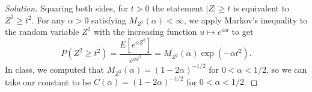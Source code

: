 \documentclass{article}
\begin{document}
\begin{proof}[Solution]
Squaring both sides, for $t > 0$ the statement $\lvert Z\rvert\geq t$ is equivalent to $Z^2\geq t^2$. For any $\alpha > 0$ satisfying $M_{Z^2}(\alpha) < \infty$, we apply Markov's inequality to the random variable $Z^2$ with the increasing function $u\mapsto e^{\alpha u}$ to get
\begin{equation*}
P(Z^2\geq t^2) = \frac{E[e^{\alpha Z^2}]}{e^{\alpha t^2}} = M_{Z^2}(\alpha)\exp(-\alpha t^2).
\end{equation*}
In class, we computed that $M_{Z^2}(\alpha) = (1 - 2\alpha)^{-1/2}$ for $0 < \alpha < 1/2$, so we can take our constant to be $C(\alpha) = (1 - 2\alpha)^{-1/2}$ for $0 < \alpha < 1/2$.
\end{proof}
\end{document}
